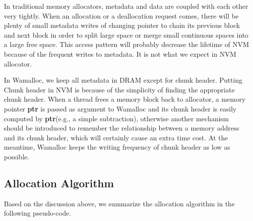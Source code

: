 \documentclass[10pt, conference, compsocconf]{IEEEtran}
\begin{document}
In traditional memory allocators, metadata and data are coupled with each other very tightly.
When an allocation or a deallocation request comes, 
there will be plenty of small metadata writes of changing pointer to chain its previous block and next block 
in order to split large space or merge small continuous spaces into a large free space.
This access pattern will probably decrease the lifetime of NVM because of the frequent writes to metadata.
It is not what we expect in NVM allocator.

In Wamalloc, we keep all metadata in DRAM except for chunk header. 
Putting Chunk header in NVM is because of the simplicity of finding the appropriate chunk header.
When a thread frees a memory block back to allocator, 
a memory pointer \textbf{ptr} is passed as argument to Wamalloc and 
its chunk header is easily computed by \textbf{ptr}(e.g., a simple subtraction),
otherwise another mechanism should be introduced to 
remember the relationship between a memory address and its chunk header,
which will certainly cause an extra time cost.
At the meantime, Wamalloc keeps the writing frequency of chunk header as low as possible. 

\subsection{Allocation Algorithm}

Based on the discussion above, we summarize the allocation algorithm in the following pseudo-code.
\end{document}
